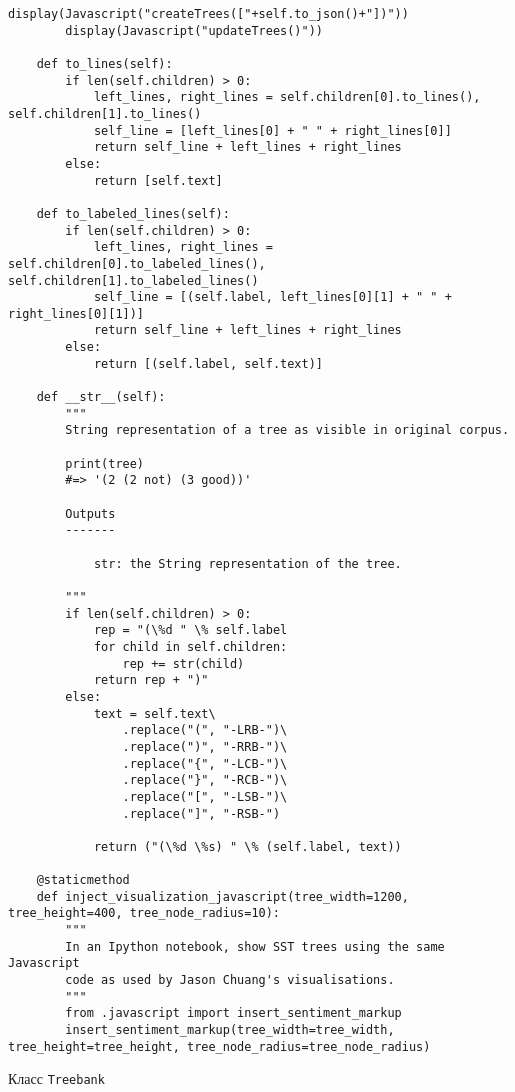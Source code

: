 \begin{lstlisting}[style=app]
        display(Javascript("createTrees(["+self.to_json()+"])"))
        display(Javascript("updateTrees()"))

    def to_lines(self):
        if len(self.children) > 0:
            left_lines, right_lines = self.children[0].to_lines(), self.children[1].to_lines()
            self_line = [left_lines[0] + " " + right_lines[0]]
            return self_line + left_lines + right_lines
        else:
            return [self.text]

    def to_labeled_lines(self):
        if len(self.children) > 0:
            left_lines, right_lines = self.children[0].to_labeled_lines(), self.children[1].to_labeled_lines()
            self_line = [(self.label, left_lines[0][1] + " " + right_lines[0][1])]
            return self_line + left_lines + right_lines
        else:
            return [(self.label, self.text)]

    def __str__(self):
        """
        String representation of a tree as visible in original corpus.

        print(tree)
        #=> '(2 (2 not) (3 good))'

        Outputs
        -------

            str: the String representation of the tree.

        """
        if len(self.children) > 0:
            rep = "(\%d " \% self.label
            for child in self.children:
                rep += str(child)
            return rep + ")"
        else:
            text = self.text\
                .replace("(", "-LRB-")\
                .replace(")", "-RRB-")\
                .replace("{", "-LCB-")\
                .replace("}", "-RCB-")\
                .replace("[", "-LSB-")\
                .replace("]", "-RSB-")

            return ("(\%d \%s) " \% (self.label, text))

    @staticmethod
    def inject_visualization_javascript(tree_width=1200, tree_height=400, tree_node_radius=10):
        """
        In an Ipython notebook, show SST trees using the same Javascript
        code as used by Jason Chuang's visualisations.
        """
        from .javascript import insert_sentiment_markup
        insert_sentiment_markup(tree_width=tree_width, tree_height=tree_height, tree_node_radius=tree_node_radius)
\end{lstlisting}

\begin{center}Класс \texttt{Treebank}\end{center}

